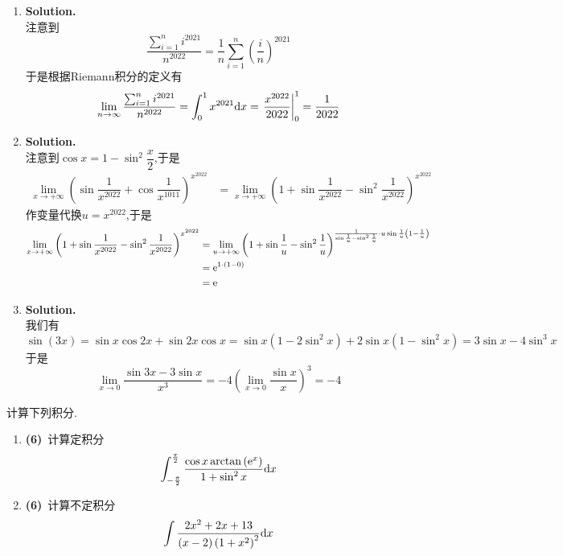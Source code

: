 \documentclass{ctexart}
\begin{document}
\begin{solution}
    \begin{enumerate}[label=\textbf{(\arabic*)}]
        \item \textbf{Solution.}\\
            注意到$$\dfrac{\sum_{i=1}^{n}i^{2021}}{n^{2022}}=\dfrac{1}{n}\sum_{i=1}^{n}\left(\dfrac{i}{n}\right)^{2021}$$
            于是根据Riemann积分的定义有
            $$\lim_{n\to\infty}\dfrac{\sum_{i=1}^{n}i^{2021}}{n^{2022}}=\int_{0}^{1}x^{2021}\mathrm{d} x=\left.\dfrac{x^{2022}}{2022}\right|_0^1=\dfrac{1}{2022}$$
        \item \textbf{Solution.}\\
            注意到$\cos x=1-\sin^2\dfrac{x}{2}$,于是
            $$\begin{aligned}
                \lim_{x\to+\infty}\left(\sin\dfrac{1}{x^{2022}}+\cos\dfrac{1}{x^{1011}}\right)^{x^{2022}}
                &= \lim_{x\to+\infty}\left(1+\sin\dfrac{1}{x^{2022}}-\sin^2\dfrac{1}{x^{2022}}\right)^{x^{2022}}
            \end{aligned}$$
            作变量代换$u=x^{2022}$,于是
            $$\begin{aligned}
                \lim_{x\to+\infty}\left(1+\sin\dfrac{1}{x^{2022}}-\sin^2\dfrac{1}{x^{2022}}\right)^{x^{2022}}
                &= \lim_{u\to+\infty}\left(1+\sin\dfrac{1}{u}-\sin^2\dfrac{1}{u}\right)^{\frac{1}{\sin\frac{1}{u}-\sin^2\frac{1}{u}}\cdot u\sin\frac{1}{u}\left(1-\frac{1}{u}\right)} \\
                &= \mathrm{e}^{1\cdot(1-0)} \\
                &= \mathrm{e}
            \end{aligned}$$
        \item \textbf{Solution.}\\
            我们有$$\sin(3x)=\sin x\cos2x+\sin2x\cos x=\sin x\left(1-2\sin^2x\right)+2\sin x\left(1-\sin^2x\right)=3\sin x-4\sin^3x$$
            于是$$\lim_{x\to0}\dfrac{\sin3x-3\sin x}{x^3}=-4\left(\lim_{x\to0}\dfrac{\sin x}{x}\right)^3=-4$$
    \end{enumerate}
\end{solution}
\begin{problem}[3.(12\songti{分})]
    计算下列积分.
    \begin{enumerate}[label=\textbf{(\arabic*)}]
        \item \textbf{(6)}\ 计算定积分$$\int_{-\frac{\pi}{2}}^{\frac{\pi}{2}}\dfrac{\cos x\arctan\left(\mathrm{e}^x\right)}{1+\sin^2x}\mathrm{d} x$$
        \item \textbf{(6)}\ 计算不定积分$$\int\dfrac{2x^2+2x+13}{(x-2)\left(1+x^2\right)^2}\mathrm{d} x$$
    \end{enumerate}
\end{problem}
\end{document}
